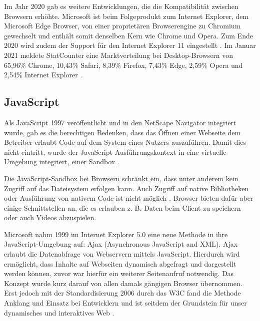 Im Jahr 2020 gab es weitere Entwicklungen, die die Kompatibilität zwischen Browsern erhöhte. Microsoft ist beim Folgeprodukt zum Internet Explorer, dem Microsoft Edge Browser, von einer proprietären Browserengine zu Chromium gewechselt \cite{MicrosoftEdgeChromium} und enthält somit denselben Kern wie Chrome und Opera. Zum Ende 2020 wird zudem der Support für den Internet Explorer 11 eingestellt \cite{MicrosoftInternetExplorerDeprecation}. Im Januar 2021 meldete StatCounter eine Marktverteilung bei Desktop-Browsern von 65,96\% Chrome, 10,43\% Safari, 8,39\% Firefox, 7,43\% Edge, 2,59\% Opera und 2,54\% Internet Explorer \cite{StatCounterBrowserMarketshare}.

\subsection{JavaScript}

Als JavaScript 1997 veröffentlicht und in den NetScape Navigator integriert wurde, gab es die berechtigen Bedenken, dass das Öffnen einer Webseite dem Betreiber erlaubt Code auf dem System eines Nutzers auszuführen. Damit dies nicht eintritt, wurde der JavaScript Ausführungskontext in eine virtuelle Umgebung integriert, einer Sandbox \cite{LearningJavaScript}.

Die JavaScript-Sandbox bei Browsern schränkt ein, dass unter anderem kein Zugriff auf das Dateisystem erfolgen kann. Auch Zugriff auf native Bibliotheken oder Ausführung von nativem Code ist nicht möglich \cite{TheSpyInTheSandbox}. Browser bieten dafür aber einige Schnittstellen an, die es erlauben z. B. Daten beim Client zu speichern oder auch Videos abzuspielen.


Microsoft nahm 1999 im Internet Explorer 5.0 eine neue Methode in ihre JavaScript-Umgebung auf: Ajax (Asynchronous JavaScript and XML). Ajax erlaubt die Datenabfrage von Webservern mittels JavaScript. Hierdurch wird ermöglicht, dass Inhalte auf Webseiten dynamisch abgefragt und dargestellt werden können, zuvor war hierfür ein weiterer Seitenaufruf notwendig. Das Konzept wurde kurz darauf von allen damals gängigen Browser übernommen. Erst jedoch mit der Standardisierung 2006 durch das W3C \cite{TheXMLHttpRequestObject} fand die Methode Anklang und Einsatz bei Entwicklern und ist seitdem der Grundstein für unser dynamisches und interaktives Web \cite{TheStoryOfXMLHTTP}.

